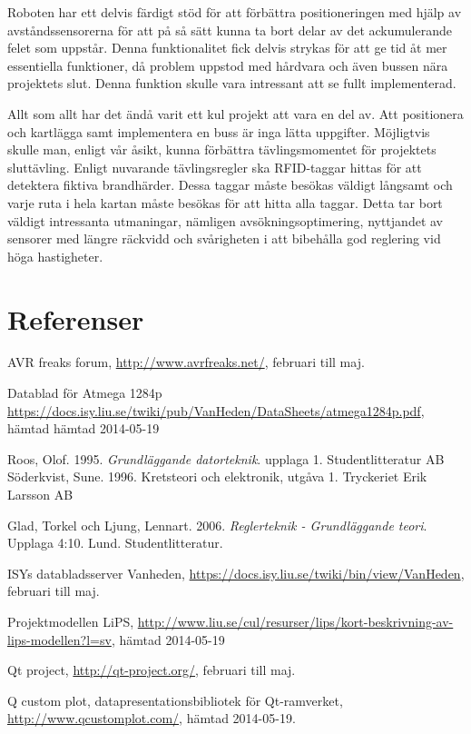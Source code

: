 \documentclass[a4paper,12pt,fleqn]{article}
\begin{document}
Roboten har ett delvis färdigt stöd för att förbättra positioneringen med hjälp av avståndssensorerna för att på så sätt kunna ta bort delar av det ackumulerande felet som uppstår. Denna funktionalitet fick delvis strykas för att ge tid åt mer essentiella funktioner, då problem uppstod med hårdvara och även bussen nära projektets slut. Denna funktion skulle vara intressant att se fullt implementerad.  

Allt som allt har det ändå varit ett kul projekt att vara en del av. Att positionera och kartlägga samt implementera en buss är inga lätta uppgifter. Möjligtvis skulle man, enligt vår åsikt, kunna förbättra tävlingsmomentet för projektets sluttävling. Enligt nuvarande tävlingsregler ska RFID-taggar hittas för att detektera fiktiva brandhärder. Dessa taggar måste besökas väldigt långsamt och varje ruta i hela kartan måste besökas för att hitta alla taggar. Detta tar bort väldigt intressanta utmaningar, nämligen avsökningsoptimering, nyttjandet av sensorer med längre räckvidd och svårigheten i att bibehålla god reglering vid höga hastigheter. 

\newpage
\section*{Referenser}

AVR freaks forum, \url{http://www.avrfreaks.net/}, februari till maj. 

Datablad för Atmega 1284p \url{https://docs.isy.liu.se/twiki/pub/VanHeden/DataSheets/atmega1284p.pdf}, hämtad hämtad 2014-05-19

Roos, Olof. 1995. \textit{Grundläggande datorteknik}. upplaga 1. Studentlitteratur AB
Söderkvist, Sune. 1996. Kretsteori och elektronik, utgåva 1. Tryckeriet Erik Larsson AB

Glad, Torkel och Ljung, Lennart. 2006. \textit{Reglerteknik - Grundläggande teori}. Upplaga 4:10. Lund. Studentlitteratur.

ISYs databladsserver Vanheden, \url{https://docs.isy.liu.se/twiki/bin/view/VanHeden}, februari till maj.

Projektmodellen LiPS, \url{http://www.liu.se/cul/resurser/lips/kort-beskrivning-av-lips-modellen?l=sv}, hämtad 2014-05-19

Qt project, \url{http://qt-project.org/}, februari till maj. 

Q custom plot, datapresentationsbibliotek för Qt-ramverket, \url{http://www.qcustomplot.com/}, hämtad 2014-05-19.
\end{document}
